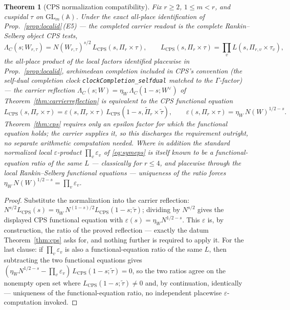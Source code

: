 \documentclass[11pt]{article}
\newtheorem{theorem}{Theorem}
\theoremstyle{definition}
\begin{document}
\begin{theorem}[CPS normalization compatibility]\label{thm:cpsnorm}
Fix $r\ge2$, $1\le m<r$, and cuspidal $\tau$ on $\mathrm{GL}_m(\mathbb A)$. Under the exact all-place
identification of Prop.~\ref{prop:localid}\,\textup{(E5)} --- the completed carrier readout \emph{is} the
complete Rankin--Selberg object CPS tests,
\[
  \Lambda_C(s;W_{r,\tau})=N(W_{r,\tau})^{s/2}\,L_{\mathrm{CPS}}(s,\Pi_r\times\tau),\qquad
  L_{\mathrm{CPS}}(s,\Pi_r\times\tau)=\prod_v L(s,\Pi_{r,v}\times\tau_v),
\]
the all-place product of the local factors identified placewise in Prop.~\ref{prop:localid}, archimedean
completion included in CPS's convention (the self-dual completion clock
\texttt{clockCompletion\_selfdual} matched to the $\Gamma$-factor) --- the carrier reflection
$\Lambda_C(s;W)=\eta_W\,\Lambda_C(1-s;W^\vee)$ of Theorem~\ref{thm:carrierreflection} is \emph{equivalent} to the
CPS functional equation
\[
  L_{\mathrm{CPS}}(s,\Pi_r\times\tau)=\varepsilon(s,\Pi_r\times\tau)\,
  L_{\mathrm{CPS}}(1-s,\widetilde\Pi_r\times\widetilde\tau),\qquad
  \varepsilon(s,\Pi_r\times\tau)=\eta_W\,N(W)^{1/2-s}.
\]
Theorem~\ref{thm:cps} requires only \emph{an} epsilon factor for which the functional equation holds; the
carrier supplies it, so this discharges the requirement outright, no separate arithmetic computation needed.
Where in addition the standard normalized local $\varepsilon$-product $\prod_v\varepsilon_v$ of
\eqref{eq:symeps} is itself known to be a functional-equation ratio of the same $L$ --- classically for
$r\le4$, and placewise through the local Rankin--Selberg functional equations --- uniqueness of the ratio
forces $\eta_W\,N(W)^{1/2-s}=\prod_v\varepsilon_v$.
\end{theorem}
\begin{proof}
Substitute the normalization into the carrier reflection:
$N^{s/2}L_{\mathrm{CPS}}(s)=\eta_W\,N^{(1-s)/2}L_{\mathrm{CPS}}(1-s;\widetilde\tau)$; dividing by $N^{s/2}$
gives the displayed CPS functional equation with $\varepsilon(s)=\eta_W N^{1/2-s}$. This $\varepsilon$ is,
by construction, the ratio of the proved reflection --- exactly the datum Theorem~\ref{thm:cps} asks for,
and nothing further is required to apply it. For the last clause: if $\prod_v\varepsilon_v$ is also a
functional-equation ratio of the same $L$, then subtracting the two functional equations gives
$(\eta_W N^{1/2-s}-\prod_v\varepsilon_v)\,L_{\mathrm{CPS}}(1-s;\widetilde\tau)=0$, so the two ratios agree on
the nonempty open set where $L_{\mathrm{CPS}}(1-s;\widetilde\tau)\ne0$ and, by continuation, identically ---
uniqueness of the functional-equation ratio, no independent placewise $\varepsilon$-computation invoked.
\end{proof}
\end{document}
